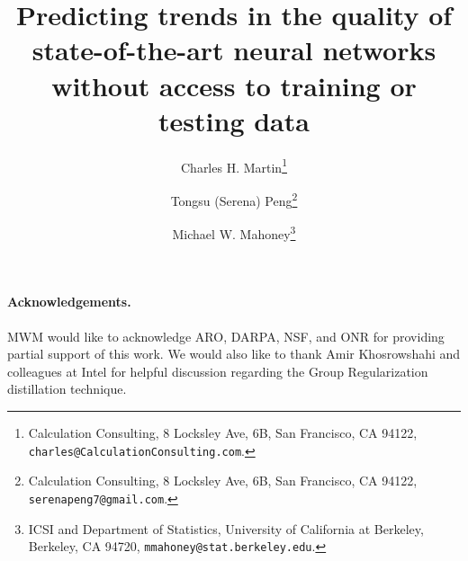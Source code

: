 \documentclass[11pt]{article}
\begin{document}
\title{%
Predicting trends in the quality of state-of-the-art neural networks without access to training or testing data
}

\author{%
Charles H. Martin\thanks{Calculation Consulting, 8 Locksley Ave, 6B, San Francisco, CA 94122, \texttt{charles@CalculationConsulting.com}.} 
\and 
Tongsu (Serena) Peng\thanks{Calculation Consulting, 8 Locksley Ave, 6B, San Francisco, CA 94122, \texttt{serenapeng7@gmail.com}.}
\and
Michael W. Mahoney\thanks{ICSI and Department of Statistics, University of California at Berkeley, Berkeley, CA 94720, \texttt{mmahoney@stat.berkeley.edu}.}
}

\date{}
\maketitle



\begin{abstract}

\end{abstract}










\noindent
\paragraph{Acknowledgements.}
MWM would like to acknowledge ARO, DARPA, NSF, and ONR for providing partial support of this work.
We would also like to thank Amir Khosrowshahi and colleagues at Intel for helpful discussion regarding the Group Regularization distillation technique.


%
{\small
%

%
}

\appendix

\end{document}
